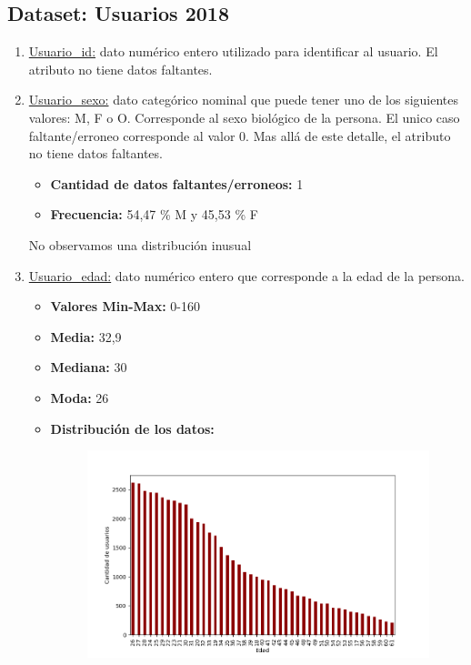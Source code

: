 \subsection{Dataset: Usuarios 2018}
\begin{enumerate}
    \item \underline{Usuario_id:} dato numérico entero utilizado para identificar al usuario. El atributo no tiene datos faltantes.
    \item \underline{Usuario_sexo:} dato categórico nominal que puede tener uno de los siguientes valores: M, F o O. Corresponde al sexo biológico de la persona. El unico caso faltante/erroneo corresponde al valor 0. Mas allá de este detalle, el atributo no tiene datos faltantes.
       \begin{itemize}
            \item \textbf{Cantidad de datos faltantes/erroneos:} 1
            \item \textbf{Frecuencia:} 54,47 \% M y 45,53 \% F
        \end{itemize}
    No observamos una distribución inusual
    \item \underline{Usuario_edad:} dato numérico entero que corresponde a la edad de la persona.
        \begin{itemize}
            \item \textbf{Valores Min-Max:} 0-160
            \item \textbf{Media:} 32,9
            \item \textbf{Mediana:} 30
            \item \textbf{Moda:} 26
            \item \textbf{Distribución de los datos:}
\begin{figure}[H]
    \centering
    \includegraphics[scale=0.7]{imagenes/edadU1.png}

\end{figure}
\end{itemize}
\end{enumerate}
